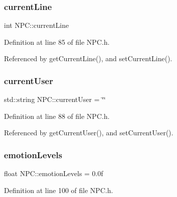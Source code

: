 \mbox{\label{class_n_p_c_a0969e4514a21f3b2966a24d78e9e3343}} 
\subsubsection{\texorpdfstring{current\+Line}{currentLine}}
{\footnotesize\ttfamily int N\+P\+C\+::current\+Line\hspace{0.3cm}{\ttfamily [private]}}



Definition at line 85 of file N\+P\+C.\+h.



Referenced by get\+Current\+Line(), and set\+Current\+Line().

\mbox{\label{class_n_p_c_a944f970943002adc4f0c970b0200c011}} 
\subsubsection{\texorpdfstring{current\+User}{currentUser}}
{\footnotesize\ttfamily std\+::string N\+P\+C\+::current\+User = \char`\"{}\char`\"{}\hspace{0.3cm}{\ttfamily [private]}}



Definition at line 88 of file N\+P\+C.\+h.



Referenced by get\+Current\+User(), and set\+Current\+User().

\mbox{\label{class_n_p_c_a804b5c812457417231e3b4ab5e06ac88}} 
\subsubsection{\texorpdfstring{emotion\+Levels}{emotionLevels}}
{\footnotesize\ttfamily float N\+P\+C\+::emotion\+Levels = 0.\+0f\hspace{0.3cm}{\ttfamily [private]}}



Definition at line 100 of file N\+P\+C.\+h.




